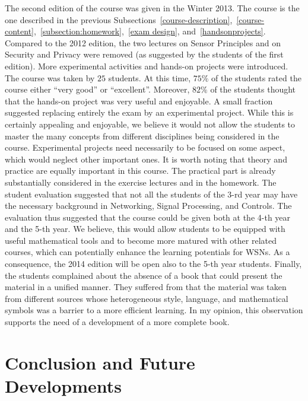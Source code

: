 \documentclass[onecolumn,12pt,draftclsnofoot,a4paper,peerreview]{IEEEtran}
\begin{document}
The second edition of the course was given in the Winter 2013. The course is the one described in the previous Subsections~\ref{course-description},~\ref{course-content},~\ref{subsection:homework},~\ref{exam design}, and~\ref{handsonprojects}. Compared to the 2012 edition, the two lectures on Sensor Principles and on Security and Privacy were removed (as suggested by the students of the first edition). More experimental activities and hands-on projects were introduced. The course was taken by $25$ students. At this time, $75\%$ of the students rated the course either ``very good'' or ``excellent''. Moreover,  $82\%$ of the students thought that the hands-on project was very useful and enjoyable. A small fraction suggested replacing entirely the exam by an experimental project. While this is certainly appealing and enjoyable, we believe it would not allow the students to master the many concepts from different disciplines being considered in the course. Experimental projects need necessarily to be focused on some aspect, which would neglect other important ones. It is worth noting that theory and practice are equally important in this course. The practical part is already substantially considered in the exercise lectures and in the homework. The student evaluation suggested that not all the students of the 3-rd year may have the necessary background in Networking, Signal Processing, and Controls. The evaluation thus suggested that the course could be given both at the 4-th year and the 5-th year. We believe, this would allow students  to be equipped with useful mathematical tools and to become more matured with other related courses, which can potentially enhance the learning potentials for WSNs. As a consequence, the 2014 edition will be open also to the 5-th year students. Finally, the students complained about the absence of a book that could present the material in a unified manner. They suffered from that the material was taken from different sources whose heterogeneous style, language, and mathematical symbols was a barrier to a more efficient learning. In my opinion, this observation supports the need of a development of a more complete book. 

\section{Conclusion and Future Developments} \label{conclusions}
\end{document}
